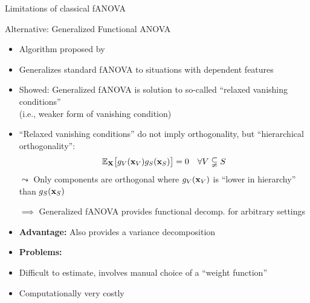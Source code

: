 \documentclass[10pt,compress,t,notes=noshow, xcolor=table]{beamer}
\newcommand{\Xv}{\mathbf{X}} %
\begin{document}
\begin{frame}{Limitations of classical fANOVA}

    
    
\end{frame}

\begin{frame}{Alternative: Generalized Functional ANOVA}

\begin{itemize}
    \item Algorithm proposed by 
    \item Generalizes standard fANOVA to situations with dependent features
    \pause
    \item Showed: Generalized fANOVA is solution to so-called ``relaxed vanishing conditions'' \\
    (i.e., weaker form of vanishing condition) \\
    \item ``Relaxed vanishing conditions'' do not imply orthogonality, but ``hierarchical orthogonality'':
    $$
    \mathbb{E}_{\Xv} \bigl[ g_{V}(\xv_V) g_{S}(\xv_S) \bigr] = 0 \quad \forall V \subsetneqq S
    $$
    \pause
    $\leadsto$ Only components are orthogonal where $g_{V}(\mathbf{x}_V)$ is ``lower in hierarchy'' than $g_{S}(\mathbf{x}_S)$
    \item[$\implies$] Generalized fANOVA provides functional decomp. for arbitrary settings
    \item \textbf{Advantage:} Also provides a variance decomposition
    \pause
    \item \textbf{Problems:}
    \item Difficult to estimate, involves manual choice of a ``weight function''
    \item Computationally very costly
    
\end{itemize}



    
\end{frame}
\end{document}
